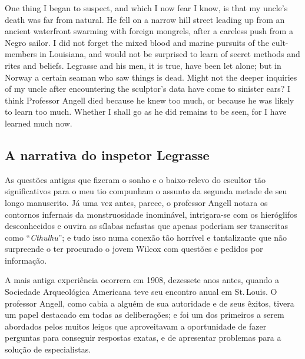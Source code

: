 \begin{pages}
\begin{Leftside}
One thing I began to suspect, and which I now fear I know, is that my
uncle's death was far from natural. He fell on a narrow hill street
leading up from an ancient waterfront swarming with foreign mongrels,
after a careless push from a Negro sailor. I did not forget the mixed
blood and marine pursuits of the cult-members in Louisiana, and would
not be surprised to learn of secret methods and rites and beliefs.
Legrasse and his men, it is true, have been let alone; but in Norway a
certain seaman who saw things is dead. Might not the deeper inquiries of
my uncle after encountering the sculptor's data have come to sinister
ears? I think Professor Angell died because he knew too much, or because
he was likely to learn too much. Whether I shall go as he did remains to
be seen, for I have learned much now.

 \pend
         \endnumbering
    \end{Leftside}
    \begin{Rightside}
        \beginnumbering
            \pstart

\chapter{A narrativa do inspetor Legrasse}

\noindent{}As questões antigas que fizeram o sonho e o baixo-relevo do escultor tão
significativos para o meu tio compunham o assunto da segunda metade de
seu longo manuscrito. Já uma vez antes, parece, o professor Angell
notara os contornos infernais da monstruosidade inominável, intrigara-se
com os hieróglifos desconhecidos e ouvira as sílabas nefastas que apenas
poderiam ser transcritas como ``\emph{Cthulhu}''; e tudo isso numa
conexão tão horrível e tantalizante que não surpreende o ter procurado o
jovem Wilcox com questões e pedidos por informação.

A mais antiga experiência ocorrera em 1908, dezessete anos antes, quando
a Sociedade Arqueológica Americana teve seu encontro anual em St.\,Louis.
O professor Angell, como cabia a alguém de sua autoridade e de seus
êxitos, tivera um papel destacado em todas as deliberações; e foi um dos
primeiros a serem abordados pelos muitos leigos que aproveitavam a
oportunidade de fazer perguntas para conseguir respostas exatas, e de
apresentar problemas para a solução de especialistas.


\end{Rightside}
\end{pages}
